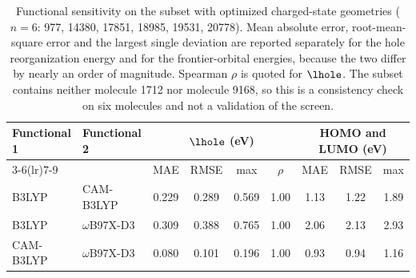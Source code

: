 \begin{table}[h]
\centering
\caption{Functional sensitivity on the subset with optimized charged-state geometries ($n = 6$: 977, 14380, 17851, 18985, 19531, 20778). Mean absolute error, root-mean-square error and the largest single deviation are reported separately for the hole reorganization energy and for the frontier-orbital energies, because the two differ by nearly an order of magnitude. Spearman $\rho$ is quoted for $\lhole$. The subset contains neither molecule 1712 nor molecule 9168, so this is a consistency check on six molecules and not a validation of the screen.}
\label{tab:functional_sensitivity}
\begin{tabular}{llccccccc}
\toprule
\multirow{2}{*}{Functional 1} & \multirow{2}{*}{Functional 2} & \multicolumn{4}{c}{$\lhole$ (\unit{\electronvolt})} & \multicolumn{3}{c}{HOMO and LUMO (\unit{\electronvolt})} \\
\cmidrule(lr){3-6}\cmidrule(lr){7-9}
 & & MAE & RMSE & max & $\rho$ & MAE & RMSE & max \\
\midrule
B3LYP & CAM-B3LYP & 0.229 & 0.289 & 0.569 & 1.00 & 1.13 & 1.22 & 1.89 \\
B3LYP & $\omega$B97X-D3 & 0.309 & 0.388 & 0.765 & 1.00 & 2.06 & 2.13 & 2.93 \\
CAM-B3LYP & $\omega$B97X-D3 & 0.080 & 0.101 & 0.196 & 1.00 & 0.93 & 0.94 & 1.16 \\
\bottomrule
\end{tabular}
\end{table}
